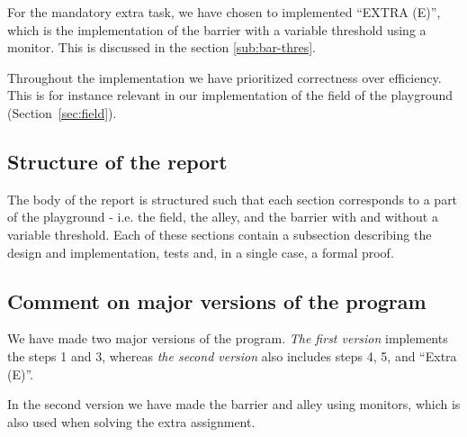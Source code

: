 For the mandatory extra task, we have chosen to implemented ``EXTRA
(E)'', which is the implementation of the barrier with a variable
threshold using a monitor. This is discussed in the section
\ref{sub:bar-thres}.

Throughout the implementation we have prioritized correctness over
efficiency. This is for instance relevant in our implementation of the
field of the playground (Section~\ref{sec:field}).


\subsection{Structure of the report}
The body of the report is structured such that each section
corresponds to a part of the playground - i.e. the field, the alley,
and the barrier with and without a variable threshold. Each of these
sections contain a subsection describing the design and
implementation, tests and, in a single case, a formal proof.


\subsection{Comment on major versions of the program}
\label{sub:versions}
We have made two major versions of the program. \emph{The first
  version} implements the steps 1 and 3, whereas \emph{the second
  version} also includes steps 4, 5, and ``Extra (E)''.

In the second version we have made the barrier and alley using
monitors, which is also used when solving the extra assignment.
